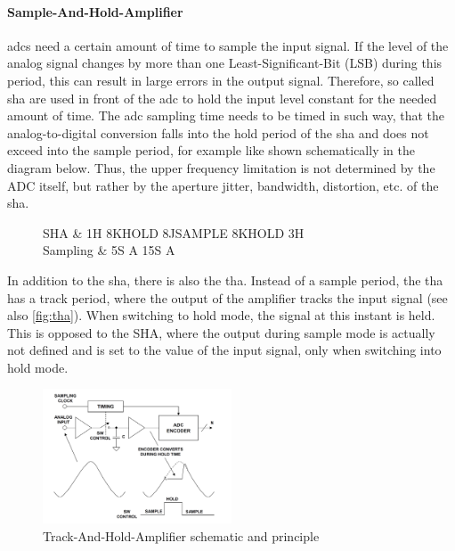 \paragraph{Sample-And-Hold-Amplifier}
\Glspl{adc} need a certain amount of time to sample the input signal.
If the level of the analog signal changes by more than one Least-Significant-Bit (LSB) during this period, this can result in large errors in the output signal.
Therefore, so called \gls{sha} are used in front of the \gls{adc} to hold the input level constant for the needed amount of time.
The \gls{adc} sampling time needs to be timed in such way, that the analog-to-digital conversion falls into the hold period of the \gls{sha} and does not exceed into the sample period, for example like shown schematically in the diagram below. Thus, the upper frequency limitation is not determined by the ADC itself, but rather by the aperture jitter, bandwidth, distortion, etc. of the \gls{sha}. \cite{walt}



\begin{figure} [H]
	\centering
	\tikzexternaldisable
	\begin{tikztimingtable}
		[%
		timing/dslope=0.1,
		timing/name/.style={font=\sffamily\normalsize},
		timing/d/text/.style={font=\sffamily\normalsize},
		grayz/.style={timing/z/.append style={gray}},
		timing/n/.style={rectangle},
		timing/metachar={{K}[2]{#1l !{++(0,+.5\yunit)} N[rectangle,scale=.6]{\shortstack{#2}} !{++(0,-.5\yunit)} #1l}},
		timing/metachar={{J}[2]{#1h !{++(0,-.5\yunit)} N[rectangle,scale=.6]{\shortstack{#2}} !{++(0,+.5\yunit)} #1h}},
		]
		SHA & 1H 8K{HOLD} 8J{SAMPLE} 8K{HOLD} 3H\\
		Sampling & 5S A 15S A                    \\
	\end{tikztimingtable}
	\tikzexternalenable
\end{figure}

In addition to the \gls{sha}, there is also the \gls{tha}. Instead of a sample period, the \gls{tha} has a track period, where the output of the amplifier tracks the input signal (see also \autoref{fig:tha}). When switching to hold mode, the signal at this instant is held. This is opposed to the SHA, where the output during sample mode is actually not defined and is set to the value of the input signal, only when switching into hold mode. 

\begin{figure}[H]
	\centering
	\includegraphics[width = 0.5\textwidth]{chap/02-theory/img/tha}
	\caption{Track-And-Hold-Amplifier schematic and principle \cite{walt}}
	\label{fig:tha}
\end{figure}

